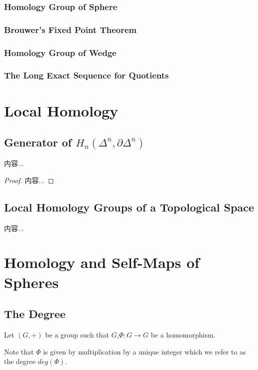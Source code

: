 \documentclass[Total.tex]{subfiles}
\begin{document}
					\subsubsection{Homology Group of Sphere}
					\subsubsection{Brouwer's Fixed Point Theorem}
					\subsubsection{Homology Group of Wedge}
					\subsubsection{The Long Exact Sequence for Quotients}
		\section{Local Homology}
			\subsection{Generator of $H_n(\Delta^n,\partial \Delta^n)$}
			
			\begin{lemma}
				内容...
			\end{lemma}
			\begin{proof}
				内容...
			\end{proof}
			\subsection{Local Homology Groups of a Topological Space}
				\begin{Def}
					内容...
				\end{Def}
		\section{Homology and Self-Maps of Spheres}
			\subsection{The Degree}
				\begin{Def}
					Let $(G,+)$ be a group such that $G$,$\Phi:G\rightarrow G$ be a homomorphism.
				
					Note that $\Phi$ is given by multiplication by a unique integer which we refer to as the degree $deg(\Phi)$.
				\end{Def}
				
\end{document}
